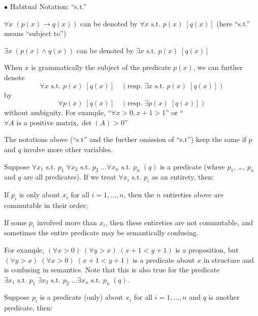 \documentclass{article}
\begin{document}
\begin{Spec}{$\bullet$ Habitual Notation: ``s.t.''}
    \begin{compactitem}
        \item \textcolor{Df}{$\forall x \;(p(x)\rightarrow q(x))$ can be denoted by $\forall x \text{ s.t. } p(x)\;[q(x)]$ (here ``s.t.'' means ``subject to'')}
        \item \textcolor{Df}{$\exists x \;(p(x)\land q(x))$ can be denoted by $\exists x \text{ s.t. } p(x)\;[q(x)]$}
        \item \textcolor{Df}{When $x$ is grammatically the subject of the predicate $p(x)$, we can further denote $$\forall x \text{ s.t. } p(x)\;[q(x)] \quad(\text{resp. }\exists x \text{ s.t. } p(x)\;[q(x)])$$ by $$\forall p(x)\;[q(x)] \quad(\text{resp. }\exists p(x)\;[q(x)])$$ without ambiguity. For example, ``$\forall x>0, x+1>1$'' or ``$\forall A \text{ is a positive matrix}, \det(A)>0$''}
        \item \textcolor{Df}{The notations above (``s.t'' and the further omission of ``s.t'') keep the same if $p$ and $q$ involve more other variables.}
        \item \textcolor{Tr}{Suppose $\forall x_1 \text{ s.t. } p_1\; \forall x_2 \text{ s.t. } p_2\; \dots \forall x_n \text{ s.t. } p_n\; (q)$ is a predicate (where $p_1$, \dots, $p_n$ and $q$ are all predicates). If we treat $\forall x_i \text{ s.t. } p_i$ as an entirety, then:
        \begin{compactenum}
            \item If $p_i$ is only about $x_i$ for all $i=1,\dots, n$, then the $n$ entireties above are commutable in their order; 
            \item If some $p_i$ involved more than $x_i$, then these entireties are not commutable, and sometimes the entire predicate may be semantically confusing.  
        \end{compactenum}
        }
        For example, $(\forall x>0)\; (\forall y>x)\; (x+1<y+1)$ is a proposition, but $(\forall y>x)\; (\forall x>0)\; (x+1<y+1)$ is a predicate about $x$ in structure and is confusing in semantics. \textcolor{Tr}{Note that this is also true for the predicate $\exists x_1 \text{ s.t. } p_1\; \exists x_2 \text{ s.t. } p_2\; \dots \exists x_n \text{ s.t. } p_n\; (q)$.}
        \item \textcolor{Tr}{Suppose $p_i$ is a predicate (only) about $x_i$ for all $i = 1, \dots, n$ and $q$ is another predicate, then:
        \begin{compactenum}

\end{compactenum}}
\end{compactitem}
\end{Spec}
\end{document}
